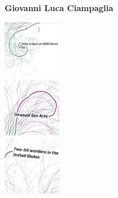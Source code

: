 \documentclass[10pt, a5paper]{article}
\begin{document}
%
\reversemarginpar
\thispagestyle{empty}
\raggedleft
\begin{minipage}[t]{.6\linewidth}
\vspace{2cm}
{\huge\bfseries Giovanni Luca Ciampaglia}\\
\end{minipage}

\newpage

\begin{minipage}[t]{.3\linewidth} 
\includegraphics[width=2.5cm]{img/notabilia_kept.png}\\[.4cm]
\includegraphics[width=2.5cm]{img/notabilia_unusual.png}\\[.4cm]
\includegraphics[width=2.5cm]{img/notabilia_two-hit.png}
\end{minipage}\hfill
\end{document}
